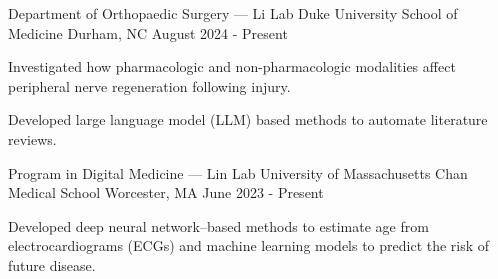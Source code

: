 
\begin{cventries}

  \cventry
    {Department of Orthopaedic Surgery — Li Lab} %
    {Duke University School of Medicine} %
    {Durham, NC} %
    {August 2024 - Present} %
    {
      \begin{cvitems} %
        \item {Investigated how pharmacologic and 
        non-pharmacologic modalities affect peripheral nerve regeneration 
        following injury.}
        \item {Developed large language model (LLM) based methods to automate 
        literature reviews.}
      \end{cvitems}
    }

  \cventry
    {Program in Digital Medicine — Lin Lab} %
    {University of Massachusetts Chan Medical School} %
    {Worcester, MA} %
    {June 2023 - Present} %
    {
      \begin{cvitems} %
        \item {Developed deep neural network–based methods to estimate age from 
        electrocardiograms (ECGs) and machine learning models to predict the 
        risk of future disease.}
      \end{cvitems}
    }


\end{cventries}
